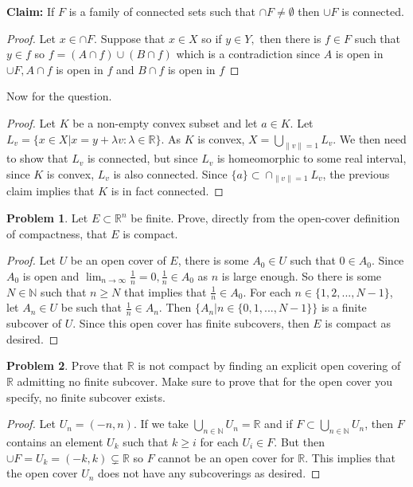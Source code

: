 \documentclass[11pt]{article}
\theoremstyle{definition}
\newtheorem{problem}{Problem}
\newcommand{\N}{\mathbb{N}}
\newcommand{\R}{\mathbb{R}}
\begin{document}
\textbf{Claim: } If $F$ is a family of connected sets such that $\cap F \neq \emptyset$ then $\cup F$ is connected.
\begin{proof}
Let $x\in \cap F$. Suppose that $x\in X$ so if $y\in Y,$ then there is $f\in F$ such that $y\in f$ so $f = (A\cap f)\cup (B\cap f)$ which is a contradiction since $A$ is open in $\cup F, A\cap f$ is open in $f$ and $B\cap f$ is open in $f$
\end{proof}
Now for the question.
\begin{proof}
Let $K$ be a non-empty convex subset and let $a\in K.$ Let $L_v = \{x\in X| x = y + \lambda v: \lambda \in \R\}$. As $K$ is convex, $X = \bigcup_{\|v\| = 1}L_v$. We then need to show that $L_v$ is connected, but since $L_v$ is homeomorphic to some real interval, since $K$ is convex, $L_v$ is also connected. Since $\{a\} \subset\cap_{\|v\| = 1}L_v$, the previous claim implies that $K$ is in fact connected.
\end{proof}

\pagebreak
\begin{problem}
Let $E \subset \R^n$ be finite. Prove, directly from the open-cover definition of compactness, that $E$ is compact. 
\end{problem}

\begin{proof}
Let $U$ be an open cover of $E$, there is some $A_0\in U$ such that $0\in A_0$. Since $A_0$ is open and $\lim_{n\to\infty}\frac{1}{n} = 0, \frac{1}{n}\in A_0$ as $n$ is large enough. So there is some $N\in \N$ such that $n \geq N$ that implies that $\frac{1}{n}\in A_0.$ For each $n\in \{1, 2, ..., N-1\}$, let $A_n\in U$ be such that $\frac{1}{n} \in A_n$. Then $\{A_n|n \in \{0, 1, ..., N-1\}\}$ is a finite subcover of $U.$ Since this open cover has finite subcovers, then $E$ is compact as desired.
\end{proof}

\pagebreak
\begin{problem}
Prove that $\R$ is not compact by finding an explicit open covering of $\R$ admitting no finite subcover. Make sure to prove that for the open cover you specify, no finite subcover exists. 
\end{problem}

\begin{proof}
Let $U_n = (-n, n)$. If we take $\bigcup_{n\in \N}U_n = \R$ and if $F\subset\bigcup_{n\in \N}U_n$, then $F$ contains an element $U_k$ such that $k\geq i$ for each $U_i \in F$. But then $\cup F = U_k = (-k, k) \subsetneq \R$ so $F$ cannot be an open cover for $\R.$ This implies that the open cover $U_n$ does not have any subcoverings as desired.
\end{proof}
\end{document}
